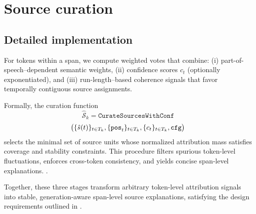 \section{Source curation}
\subsection{Detailed implementation}
\label{appendix:source_curation}

For tokens within a span, we compute weighted votes that combine:
(i) part-of-speech–dependent semantic weights,
(ii) confidence scores $c_t$ (optionally exponentiated),
and (iii) run-length–based coherence signals that favor temporally contiguous source assignments.

Formally, the curation function
$$
\hat{\mathcal{S}}_k
=
\texttt{CurateSourcesWithConf}
$$
$$
\big(
\{\hat{s}(t)\}_{t\in T_k}, \\
\{\texttt{pos}_t\}_{t\in T_k},
\{c_t\}_{t\in T_k},
\texttt{cfg}
\big)
$$
selects the minimal set of source units whose normalized attribution mass satisfies coverage and stability constraints. This procedure filters spurious token-level fluctuations, enforces cross-token consistency, and yields concise span-level explanations. .

Together, these three stages transform arbitrary token-level attribution signals into stable, generation-aware span-level source explanations, satisfying the design requirements outlined in .

